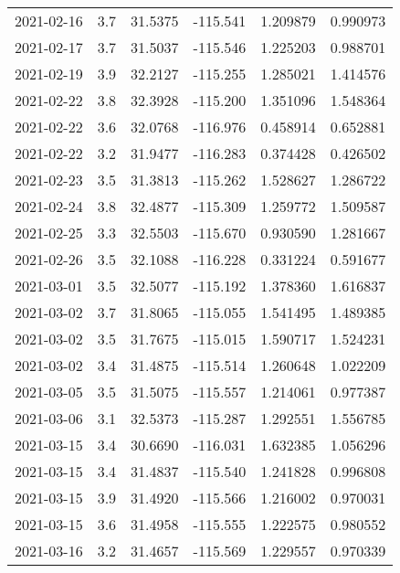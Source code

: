 \begin{tabular}{lrrrrr}
2021-02-16 &       3.7 &  31.5375 &  -115.541 &         1.209879 &         0.990973 \\
2021-02-17 &       3.7 &  31.5037 &  -115.546 &         1.225203 &         0.988701 \\
2021-02-19 &       3.9 &  32.2127 &  -115.255 &         1.285021 &         1.414576 \\
2021-02-22 &       3.8 &  32.3928 &  -115.200 &         1.351096 &         1.548364 \\
2021-02-22 &       3.6 &  32.0768 &  -116.976 &         0.458914 &         0.652881 \\
2021-02-22 &       3.2 &  31.9477 &  -116.283 &         0.374428 &         0.426502 \\
2021-02-23 &       3.5 &  31.3813 &  -115.262 &         1.528627 &         1.286722 \\
2021-02-24 &       3.8 &  32.4877 &  -115.309 &         1.259772 &         1.509587 \\
2021-02-25 &       3.3 &  32.5503 &  -115.670 &         0.930590 &         1.281667 \\
2021-02-26 &       3.5 &  32.1088 &  -116.228 &         0.331224 &         0.591677 \\
2021-03-01 &       3.5 &  32.5077 &  -115.192 &         1.378360 &         1.616837 \\
2021-03-02 &       3.7 &  31.8065 &  -115.055 &         1.541495 &         1.489385 \\
2021-03-02 &       3.5 &  31.7675 &  -115.015 &         1.590717 &         1.524231 \\
2021-03-02 &       3.4 &  31.4875 &  -115.514 &         1.260648 &         1.022209 \\
2021-03-05 &       3.5 &  31.5075 &  -115.557 &         1.214061 &         0.977387 \\
2021-03-06 &       3.1 &  32.5373 &  -115.287 &         1.292551 &         1.556785 \\
2021-03-15 &       3.4 &  30.6690 &  -116.031 &         1.632385 &         1.056296 \\
2021-03-15 &       3.4 &  31.4837 &  -115.540 &         1.241828 &         0.996808 \\
2021-03-15 &       3.9 &  31.4920 &  -115.566 &         1.216002 &         0.970031 \\
2021-03-15 &       3.6 &  31.4958 &  -115.555 &         1.222575 &         0.980552 \\
2021-03-16 &       3.2 &  31.4657 &  -115.569 &         1.229557 &         0.970339 \\

\end{tabular}
